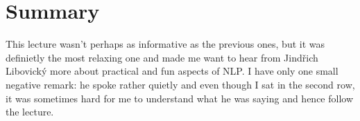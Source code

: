 \documentclass[a4paper]{article}
\begin{document}
\section*{Summary}

This lecture wasn't perhaps as informative as the previous ones, but it was definietly the most relaxing one and made me want to hear from Jindřich Libovický more about practical and fun aspects of NLP. I have only one small negative remark: he spoke rather quietly and even though I sat in the second row, it was sometimes hard for me to understand what he was saying and hence follow the lecture.
\end{document}
